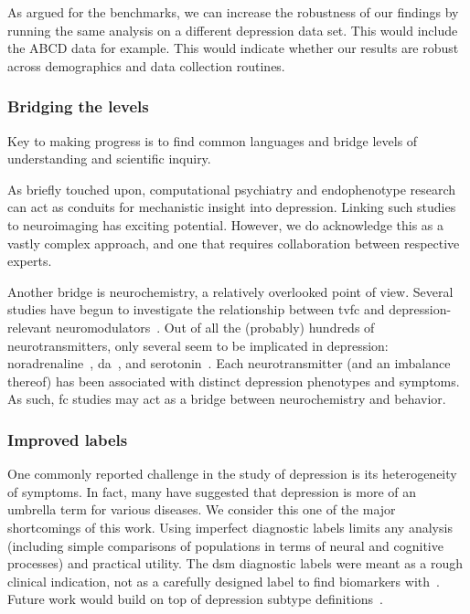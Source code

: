 As argued for the benchmarks, we can increase the robustness of our findings by running the same analysis on a different depression data set.
This would include the ABCD data for example.
This would indicate whether our results are robust across demographics and data collection routines.

\subsubsection{Bridging the levels}

Key to making progress is to find common languages and bridge levels of understanding and scientific inquiry.

As briefly touched upon, computational psychiatry and endophenotype research can act as conduits for mechanistic insight into depression.
Linking such studies to neuroimaging has exciting potential.
However, we do acknowledge this as a vastly complex approach, and one that requires collaboration between respective experts.

Another bridge is neurochemistry, a relatively overlooked point of view.
Several studies have begun to investigate the relationship between \gls{tvfc} and depression-relevant neuromodulators~\parencite{Shine2019}.
Out of all the (probably) hundreds of neurotransmitters, only several seem to be implicated in depression: noradrenaline~\parencite[also known as norepinephrine; a neurotransmitter found in pleasure pathways; see][]{Shine2018}, \gls{da}~\parencite{Shafiei2019}, and serotonin~\parencite{Klaassens2017}.
Each neurotransmitter (and an imbalance thereof) has been associated with distinct depression phenotypes and symptoms.
As such, \gls{fc} studies may act as a bridge between neurochemistry and behavior.

\subsubsection{Improved labels}

One commonly reported challenge in the study of depression is its heterogeneity of symptoms.
In fact, many have suggested that depression is more of an umbrella term for various diseases.
We consider this one of the major shortcomings of this work.
Using imperfect diagnostic labels limits any analysis (including simple comparisons of populations in terms of neural and cognitive processes) and practical utility.
The \gls{dsm} diagnostic labels were meant as a rough clinical indication, not as a carefully designed label to find biomarkers with~\parencite{Fried2022b}.
Future work would build on top of depression subtype definitions~\parencite{Tokuda2018}.

